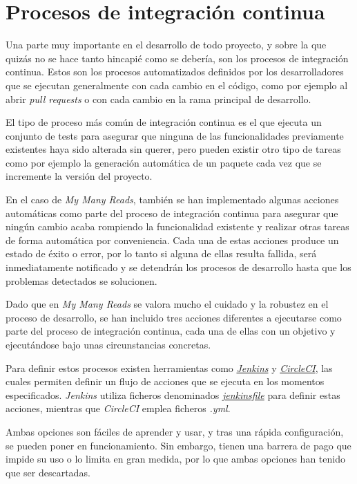 \section{Procesos de integración continua}

Una parte muy importante en el desarrollo de todo proyecto, y sobre la que quizás no se hace tanto hincapié como se debería, son los procesos de integración continua. Estos son los procesos automatizados definidos por los desarrolladores que se ejecutan generalmente con cada cambio en el código, como por ejemplo al abrir \textit{pull requests} o con cada cambio en la rama principal de desarrollo.

El tipo de proceso más común de integración continua es el que ejecuta un conjunto de tests para asegurar que ninguna de las funcionalidades previamente existentes haya sido alterada sin querer, pero pueden existir otro tipo de tareas como por ejemplo la generación automática de un paquete cada vez que se incremente la versión del proyecto.

En el caso de \textit{My Many Reads}, también se han implementado algunas acciones automáticas como parte del proceso de integración continua para asegurar que ningún cambio acaba rompiendo la funcionalidad existente y realizar otras tareas de forma automática por conveniencia. Cada una de estas acciones produce un estado de éxito o error, por lo tanto si alguna de ellas resulta fallida, será inmediatamente notificado y se detendrán los procesos de desarrollo hasta que los problemas detectados se solucionen.

Dado que en \textit{My Many Reads} se valora mucho el cuidado y la robustez en el proceso de desarrollo, se han incluido tres acciones diferentes a ejecutarse como parte del proceso de integración continua, cada una de ellas con un objetivo y ejecutándose bajo unas circunstancias concretas. 

Para definir estos procesos existen herramientas como \href{https://www.jenkins.io/}{\textit{Jenkins}} y \href{https://circleci.com/}{\textit{CircleCI}}, las cuales permiten definir un flujo de acciones que se ejecuta en los momentos especificados. \textit{Jenkins} utiliza ficheros denominados \href{https://www.jenkins.io/doc/book/pipeline/jenkinsfile/}{\textit{jenkinsfile}} para definir estas acciones, mientras que \textit{CircleCI} emplea ficheros \textit{.yml}.

Ambas opciones son fáciles de aprender y usar, y tras una rápida configuración, se pueden poner en funcionamiento. Sin embargo, tienen una barrera de pago que impide su uso o lo limita en gran medida, por lo que ambas opciones han tenido que ser descartadas.

